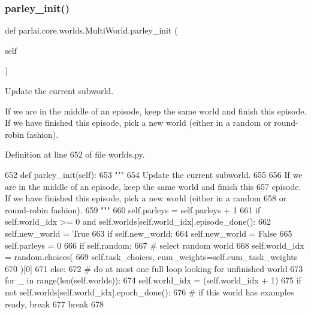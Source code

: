 \subsubsection{\texorpdfstring{parley\+\_\+init()}{parley\_init()}}
{\footnotesize\ttfamily def parlai.\+core.\+worlds.\+Multi\+World.\+parley\+\_\+init (\begin{DoxyParamCaption}\item[{}]{self }\end{DoxyParamCaption})}

\begin{DoxyVerb}Update the current subworld.

If we are in the middle of an episode, keep the same world and finish this
episode. If we have finished this episode, pick a new world (either in a random
or round-robin fashion).
\end{DoxyVerb}
 

Definition at line 652 of file worlds.\+py.


\begin{DoxyCode}
652     \textcolor{keyword}{def }parley\_init(self):
653         \textcolor{stringliteral}{"""}
654 \textcolor{stringliteral}{        Update the current subworld.}
655 \textcolor{stringliteral}{}
656 \textcolor{stringliteral}{        If we are in the middle of an episode, keep the same world and finish this}
657 \textcolor{stringliteral}{        episode. If we have finished this episode, pick a new world (either in a random}
658 \textcolor{stringliteral}{        or round-robin fashion).}
659 \textcolor{stringliteral}{        """}
660         self.parleys = self.parleys + 1
661         \textcolor{keywordflow}{if} self.world\_idx >= 0 \textcolor{keywordflow}{and} self.worlds[self.world\_idx].episode\_done():
662             self.new\_world = \textcolor{keyword}{True}
663         \textcolor{keywordflow}{if} self.new\_world:
664             self.new\_world = \textcolor{keyword}{False}
665             self.parleys = 0
666             \textcolor{keywordflow}{if} self.random:
667                 \textcolor{comment}{# select random world}
668                 self.world\_idx = random.choices(
669                     self.task\_choices, cum\_weights=self.cum\_task\_weights
670                 )[0]
671             \textcolor{keywordflow}{else}:
672                 \textcolor{comment}{# do at most one full loop looking for unfinished world}
673                 \textcolor{keywordflow}{for} \_ \textcolor{keywordflow}{in} range(len(self.worlds)):
674                     self.world\_idx = (self.world\_idx + 1) %
675                     \textcolor{keywordflow}{if} \textcolor{keywordflow}{not} self.worlds[self.world\_idx].epoch\_done():
676                         \textcolor{comment}{# if this world has examples ready, break}
677                         \textcolor{keywordflow}{break}
678 
\end{DoxyCode}
\mbox{\label{classparlai_1_1core_1_1worlds_1_1MultiWorld_aa89365baa3672e08d8e239199df4eda7}} 
